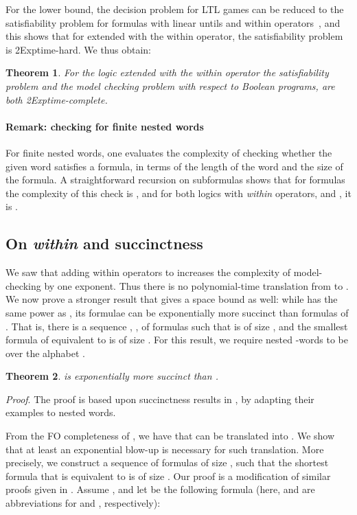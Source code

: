 \documentclass{LMCS}
\theoremstyle{plain}
\newtheorem{theorem}{Theorem}[section]
\theoremstyle{definition}
\newcommand{\EXPTIME}{{\sc Exptime}}
\newcounter{example}
\begin{document}
For the lower bound, the decision problem for LTL games can be reduced 
to the satisfiability problem for formulas with linear untils and within
operators~\cite{Madhu04}, and this shows that
for   extended with the within operator,
the satisfiability problem is 2\EXPTIME-hard.
We thus obtain:
\begin{theorem}
For the logic  extended with the within operator 
the satisfiability problem and the model checking problem with respect to
Boolean programs, are both 2\EXPTIME-complete.
\end{theorem}

\paragraph{Remark: checking  for finite nested words} For finite
nested words, one evaluates the 
complexity of checking whether the given word satisfies a formula,
 in terms of the length  of the word and the size of the formula. 
A straightforward recursion on
subformulas shows that for  formulas the complexity of
this check is , and for both logics with
{\em within} operators,  and , it is 
. 




\subsection{On {\em within} and succinctness} We saw that adding
within operators to  increases the complexity of
model-checking by one exponent. Thus there is no
polynomial-time translation from  to . We now
prove a stronger result that gives a space bound as well: while
 has the same power as , its formulae can be
exponentially more succinct than formulas of . That is, there
is a sequence , , of  formulas such that
 is of size , and the smallest formula of 
equivalent to  is of size .  For this result,
we require nested -words to be over the alphabet .


\begin{theorem}\label{succinct-theo}
 is exponentially more succinct than .
\end{theorem}

{\em Proof}. 
The proof is based upon succinctness results in \cite{EVW02,LMS}, by
adapting their examples to nested words. 

From the FO completeness of , we have that  can be
translated into . We show that at least an exponential blow-up
is necessary for such translation. More precisely, we construct a
sequence  of  formulas of size
, such that the shortest  formula that is equivalent to
 is of size . Our proof is a modification of
similar proofs given in \cite{EVW02,LMS}.  Assume , and let  be the following 
formula (here,  and  are
abbreviations for  and ,
respectively):
\end{document}
